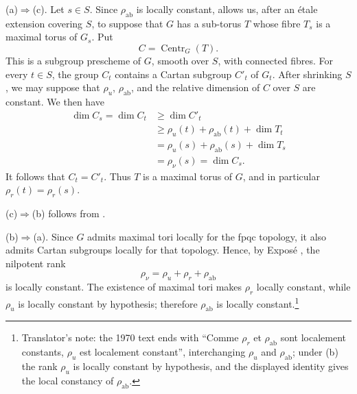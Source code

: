 \textup{(a)}\(\Rightarrow\)\textup{(c)}.
Let \(s\in S\). Since \(\rho_{\mathrm{ab}}\) is locally constant,
 allows us, after an étale extension covering \(S\),
to suppose that \(G\) has a sub-torus \(T\) whose fibre \(T_s\) is
a maximal torus of \(G_s\). Put
\[
  C=\operatorname{Centr}_G(T).
\]
This is a subgroup prescheme of \(G\), smooth over \(S\), with
connected fibres. For every \(t\in S\), the group \(C_t\) contains
a Cartan subgroup \(C'_t\) of \(G_t\). After shrinking \(S\), we
may suppose that \(\rho_u\), \(\rho_{\mathrm{ab}}\), and the
relative dimension of \(C\) over \(S\) are constant. We then have
\[
\begin{aligned}
  \dim C_s=\dim C_t
  &\geq \dim C'_t\\
  &\geq \rho_u(t)+\rho_{\mathrm{ab}}(t)+\dim T_t\\
  &=\rho_u(s)+\rho_{\mathrm{ab}}(s)+\dim T_s\\
  &=\rho_\nu(s)=\dim C_s.
\end{aligned}
\]
It follows that \(C_t=C'_t\). Thus \(T\) is a maximal torus of
\(G\), and in particular \(\rho_r(t)=\rho_r(s)\).

\textup{(c)}\(\Rightarrow\)\textup{(b)} follows from
.

\textup{(b)}\(\Rightarrow\)\textup{(a)}.
Since \(G\) admits maximal tori locally for the fpqc topology, it
also admits Cartan subgroups locally for that topology. Hence, by
Exposé , the nilpotent rank
\[
  \rho_\nu=\rho_u+\rho_r+\rho_{\mathrm{ab}}
\]
is locally constant. The existence of maximal tori makes
\(\rho_r\) locally constant, while \(\rho_u\) is locally constant
by hypothesis; therefore \(\rho_{\mathrm{ab}}\) is locally
constant.\footnote{Translator's note: the 1970 text ends with ``Comme
\(\rho_r\) et \(\rho_{\mathrm{ab}}\) sont localement constants, \(\rho_u\) est
localement constant'', interchanging \(\rho_u\) and \(\rho_{\mathrm{ab}}\);
under (b) the rank \(\rho_u\) is locally constant by hypothesis, and the
displayed identity gives the local constancy of \(\rho_{\mathrm{ab}}\).}
